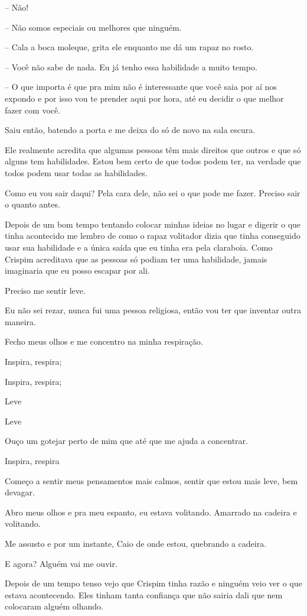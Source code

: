 -- Não!

-- Não somos especiais ou melhores que ninguém.

-- Cala a boca moleque, grita ele enquanto me dá um rapaz no rosto.

-- Você não sabe de nada. Eu já tenho essa habilidade a muito tempo.

-- O que importa é que pra mim não é interessante que você saia por aí nos expondo e por isso vou te prender aqui por hora, até eu decidir o que melhor fazer com você. 

Saiu então, batendo a porta e me deixa do só de novo na sala escura.

Ele realmente acredita que algumas pessoas têm mais direitos que outros e que só alguns tem habilidades. Estou bem certo de que todos podem ter, na verdade que todos podem usar todas as habilidades.

Como eu vou sair daqui? Pela cara dele, não sei o que pode me fazer. Preciso sair o quanto antes.

Depois de um bom tempo tentando colocar minhas ideias no lugar e digerir o que tinha acontecido me lembro de como o rapaz volitador dizia que tinha conseguido usar sua habilidade e a única saída que eu tinha era pela claraboia. Como Crispim acreditava que as pessoas só podiam ter uma habilidade, jamais imaginaria que eu posso escapar por ali.

Preciso me sentir leve.

Eu não sei rezar, nunca fui uma pessoa religiosa, então vou ter que inventar outra maneira.

Fecho meus olhos e me concentro na minha respiração.

Inspira, respira;

Inspira, respira;

Leve

Leve

Ouço um gotejar perto de mim que até que me ajuda a concentrar.

Inspira, respira

Começo a sentir meus pensamentos mais calmos, sentir que estou mais leve, bem devagar.

Abro meus olhos e pra meu espanto, eu estava volitando. Amarrado na cadeira e volitando.

Me assusto e por um instante, Caio de onde estou, quebrando a cadeira.

E agora? Alguém vai me ouvir. 

Depois de um tempo tenso vejo que Crispim tinha razão e ninguém veio ver o que estava acontecendo. Eles tinham tanta confiança que não sairia dali que nem colocaram alguém olhando.

